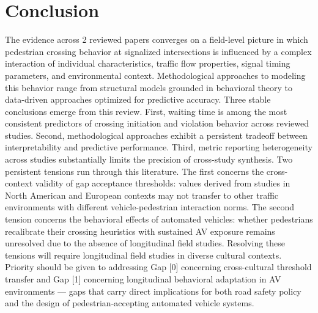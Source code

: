 \documentclass{article}
\begin{document}
\section{Conclusion}
The evidence across 2 reviewed papers converges on a field-level picture in which pedestrian crossing behavior at signalized intersections is influenced by a complex interaction of individual characteristics, traffic flow properties, signal timing parameters, and environmental context. Methodological approaches to modeling this behavior range from structural models grounded in behavioral theory to data-driven approaches optimized for predictive accuracy. Three stable conclusions emerge from this review. First, waiting time is among the most consistent predictors of crossing initiation and violation behavior across reviewed studies. Second, methodological approaches exhibit a persistent tradeoff between interpretability and predictive performance. Third, metric reporting heterogeneity across studies substantially limits the precision of cross-study synthesis. Two persistent tensions run through this literature. The first concerns the cross-context validity of gap acceptance thresholds: values derived from studies in North American and European contexts may not transfer to other traffic environments with different vehicle-pedestrian interaction norms. The second tension concerns the behavioral effects of automated vehicles: whether pedestrians recalibrate their crossing heuristics with sustained AV exposure remains unresolved due to the absence of longitudinal field studies. Resolving these tensions will require longitudinal field studies in diverse cultural contexts. Priority should be given to addressing Gap [0] concerning cross-cultural threshold transfer and Gap [1] concerning longitudinal behavioral adaptation in AV environments — gaps that carry direct implications for both road safety policy and the design of pedestrian-accepting automated vehicle systems.
\end{document}
